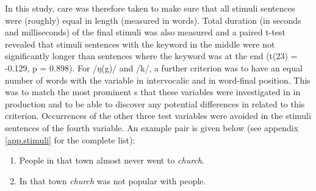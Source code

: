 In this study, care was therefore taken to make sure that all stimuli sentences were (roughly) equal in length (measured in words).
Total duration (in seconds and milliseconds) of the final stimuli was also measured and a paired t-test revealed that stimuli sentences with the keyword in the middle were not significantly longer than sentences where the keyword was at the end (t(23) = -0.129, p = 0.898).
For /ŋ(g)/ and /k/, a further criterion was to have an equal number of words with the variable in intervocalic and in word-final position.
This was to match the most prominent s that these variables were investigated in in production and to be able to discover any potential differences in  related to this criterion.
Occurrences of the other three test variables were avoided in the stimuli sentences of the fourth variable.
An example pair is given below (see appendix \ref{app.stimuli} for the complete list):

\begin{enumerate}
	\item People in that town almost never went to \emph{church}.
	\item In that town \emph{church} was not popular with people.
\end{enumerate}

